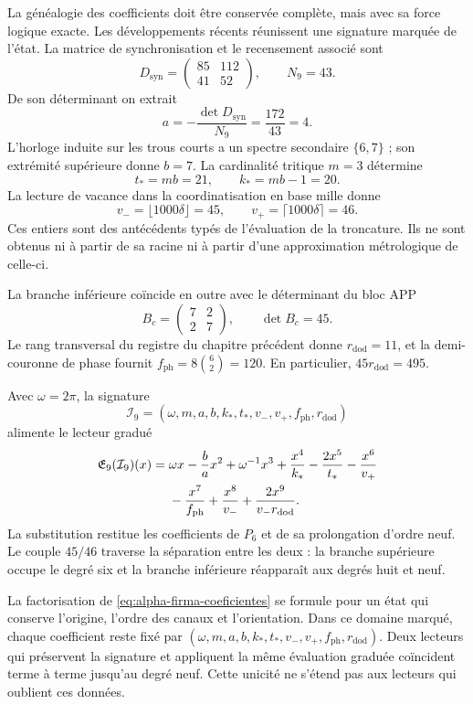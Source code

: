 La généalogie des coefficients doit être conservée complète, mais avec sa
force logique exacte. Les développements récents réunissent une signature marquée
de l'état. La matrice de synchronisation et le recensement associé sont
\[
 D_{\mathrm{syn}}=\begin{pmatrix}85&112\\41&52\end{pmatrix},
 \qquad N_9=43.
\]
De son déterminant on extrait
\[
 a=-\frac{\det D_{\mathrm{syn}}}{N_9}
   =\frac{172}{43}=4.
\]
L'horloge induite sur les trous courts a un spectre secondaire \(\{6,7\}\) ; son extrémité supérieure donne \(b=7\). La cardinalité tritique \(m=3\) détermine
\[
 t_*=mb=21,\qquad k_*=mb-1=20.
\]
La lecture de vacance dans la coordinatisation en base mille donne
\[
 v_-=\lfloor1000\delta\rfloor=45,\qquad
 v_+=\lceil1000\delta\rceil=46.
\]
Ces entiers sont des antécédents typés de l'évaluation de la troncature. Ils ne sont obtenus ni à partir de sa racine ni à partir d'une approximation métrologique de celle-ci.

La branche inférieure coïncide en outre avec le déterminant du bloc APP
\[
 B_c=\begin{pmatrix}7&2\\2&7\end{pmatrix},\qquad\det B_c=45.
\]
Le rang transversal du registre du chapitre précédent donne
\(r_{\mathrm{dod}}=11\), et la demi-couronne de phase fournit
\(f_{\mathrm{ph}}=8\binom62=120\). En particulier,
\(45r_{\mathrm{dod}}=495\).

Avec \(\omega=2\pi\), la signature
\[
 \mathcal I_9=(\omega,m,a,b,k_*,t_*,v_-,v_+,f_{\mathrm{ph}},r_{\mathrm{dod}})
\]
alimente le lecteur gradué
\begin{align}
 \mathfrak E_9(\mathcal I_9)(x)
 ={}&\omega x-\frac ba x^2+\omega^{-1}x^3
 +\frac{x^4}{k_*}-\frac{2x^5}{t_*}-\frac{x^6}{v_+}\notag\\
 &-\frac{x^7}{f_{\mathrm{ph}}}+\frac{x^8}{v_-}
 +\frac{2x^9}{v_-r_{\mathrm{dod}}}.
 \label{eq:alpha-firma-coeficientes}
\end{align}
La substitution restitue les coefficients de \(P_6\) et de sa
prolongation d'ordre neuf. Le couple \(45/46\) traverse la séparation
entre les deux : la branche supérieure occupe le degré six et la branche inférieure réapparaît
aux degrés huit et neuf.

La factorisation de \eqref{eq:alpha-firma-coeficientes} se formule  
pour un état qui conserve l'origine, l'ordre des canaux et l'orientation.  
Dans ce domaine marqué, chaque coefficient reste fixé par  
\((\omega,m,a,b,k_*,t_*,v_-,v_+,f_{\mathrm{ph}},r_{\mathrm{dod}})\).  
Deux lecteurs qui préservent la signature et appliquent la même évaluation  
graduée coïncident terme à terme jusqu'au degré neuf. Cette  
unicité ne s'étend pas aux lecteurs qui oublient ces données.

